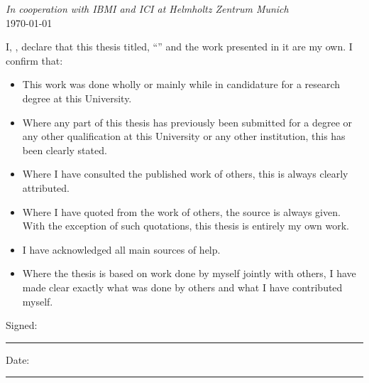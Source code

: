 \documentclass[
11pt, %
oneside, %
english, %
singlespacing, %
parskip, %
headsepline, %
]{MastersDoctoralThesis} %
\begin{document}
\begin{titlepage}
\begin{center}
\vfill

\large \textit{In cooperation with IBMI and ICI at Helmholtz Zentrum Munich}\\[0.1cm] %
{\large \today}\\[4cm] %

\vfill
\end{center}
\end{titlepage}


\begin{declaration}
\addchaptertocentry{\authorshipname} %
\noindent I, \authorname, declare that this thesis titled, \enquote{\ttitle} and the work presented in it are my own. I confirm that:

\begin{itemize}
\item This work was done wholly or mainly while in candidature for a research degree at this University.
\item Where any part of this thesis has previously been submitted for a degree or any other qualification at this University or any other institution, this has been clearly stated.
\item Where I have consulted the published work of others, this is always clearly attributed.
\item Where I have quoted from the work of others, the source is always given. With the exception of such quotations, this thesis is entirely my own work.
\item I have acknowledged all main sources of help.
\item Where the thesis is based on work done by myself jointly with others, I have made clear exactly what was done by others and what I have contributed myself.\\
\end{itemize}

\noindent Signed:\\
\rule[0.5em]{25em}{0.5pt} %

\noindent Date:\\
\rule[0.5em]{25em}{0.5pt} %
\end{declaration}
\end{document}
